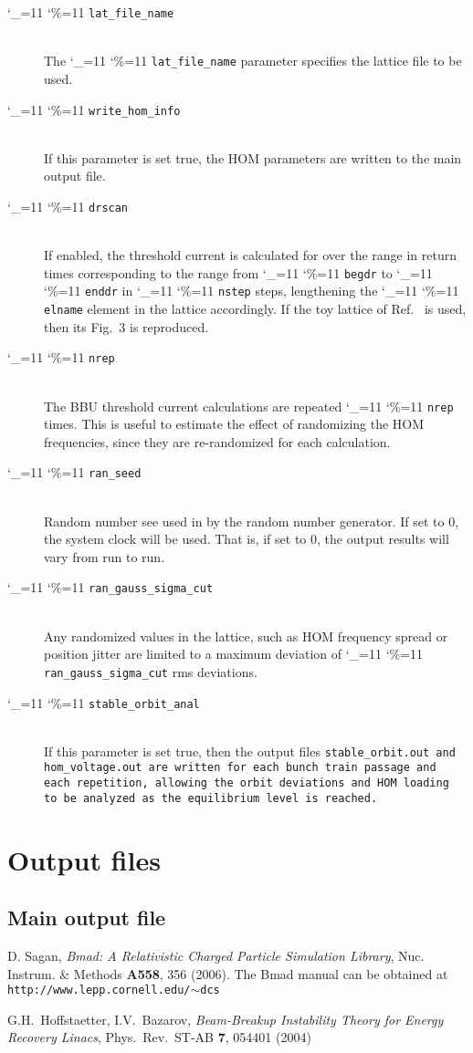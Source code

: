 \documentclass[11pt]{article}
\newcommand\ttcmd{\begingroup\catcode`\_=11 \catcode`\%=11 \dottcmd}
\newcommand\dottcmd[1]{\texttt{#1}\endgroup}
\newcommand{\vn}{\ttcmd}
\newcommand{\Newline}{\hfil \\}
\begin{document}
  \begin{description}
  \item[\vn{lat_file_name}] \Newline
The \vn{lat_file_name} parameter specifies the lattice file to be used.
  \item[\vn{write_hom_info}] \Newline
If this parameter is set true, the HOM parameters are written to the main output file.
  \item[\vn{drscan}] \Newline
If enabled, the threshold current is calculated for over the range in return times
corresponding to the range from \vn{begdr} to \vn{enddr} in  \vn{nstep} steps,
lengthening the \vn{elname} element in the lattice accordingly. If the toy lattice
of Ref.~\cite{ref:Hoffstaetter04} is used, then its Fig.~3 is reproduced.
  \item[\vn{nrep}] \Newline
The BBU threshold current calculations are repeated \vn{nrep} times. This is useful
to estimate the effect of randomizing the HOM frequencies, since they are re-randomized for
each calculation.
  \item[\vn{ran_seed}] \Newline
Random number see used in by the random number generator. If set to 0, the system clock
will be used. That is, if set to 0, the output results will vary from run to run. 
  \item[\vn{ran_gauss_sigma_cut}] \Newline
Any randomized values in the lattice, such as HOM frequency spread or position jitter
are limited to a maximum deviation of \vn{ran_gauss_sigma_cut} rms deviations. 
  \item[\vn{stable_orbit_anal}] \Newline
If this parameter is set true, then the output files \tt{stable_orbit.out} and \tt{hom_voltage.out}
are written for each bunch train passage and each repetition, allowing the orbit deviations
and HOM loading to be analyzed as the equilibrium level is reached.

\end{description}
\section{Output files} 

\subsection{Main output file}

\begin{thebibliography}{9}


D. Sagan, {\em Bmad: A Relativistic Charged Particle Simulation Library},
Nuc. Instrum. \& Methods {\bf A558}, 356 (2006).
The Bmad manual can be obtained at {\tt http://www.lepp.cornell.edu/{$\sim$}dcs}

 G.H.~Hoffstaetter, I.V.~Bazarov, \emph{
Beam-Breakup Instability Theory for Energy Recovery Linacs},
Phys.~Rev.~ST-AB {\bf 7}, 054401 (2004)

\end{thebibliography}
\end{document}
